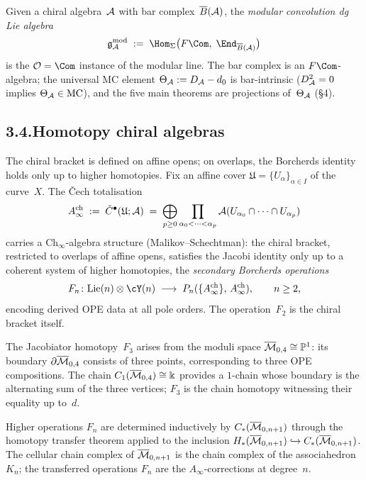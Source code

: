 Given a chiral algebra~$\mathcal{A}$ with bar complex~$\overline{B}(\mathcal{A})$,
the \emph{modular convolution dg Lie algebra}
\begin{equation}\label{eq:preface-gmod}
\gAmod
\;:=\;
\Hom_\Sigma\bigl(F\Com,\;\End_{\barB(\cA)}\bigr)
\end{equation}
is the $\cO=\Com$ instance of the modular line. The bar complex
is an $F\Com$-algebra; the universal MC element $\Theta_{\mathcal{A}} :=
D_{\mathcal{A}} - d_0$ is bar-intrinsic ($D_{\mathcal{A}}^2 = 0$ implies
$\Theta_{\mathcal{A}} \in \operatorname{MC}$), and the five main
theorems are projections of~$\Theta_{\mathcal{A}}$ (\S4).

\subsection*{3.4.\enspace Homotopy chiral algebras}

The chiral bracket is defined on affine opens; on overlaps, the
Borcherds identity holds only up to higher homotopies.
Fix an affine cover $\mathfrak U=\{U_\alpha\}_{\alpha\in I}$ of the
curve~$X$. The \v{C}ech totalisation
\[
A^{\mathrm{ch}}_\infty
\;:=\;
\check C^\bullet(\mathfrak U;\mathcal{A})
\;=\;
\bigoplus_{p\ge 0}
\prod_{\alpha_0<\cdots<\alpha_p}
\mathcal{A}(U_{\alpha_0}\cap\cdots\cap U_{\alpha_p})
\]
carries a $\mathrm{Ch}_\infty$-algebra structure
(Malikov--Schechtman): the chiral bracket, restricted to
overlaps of affine opens, satisfies the Jacobi identity only up to
a coherent system of higher homotopies, the \emph{secondary
Borcherds operations}
\[
F_n\colon\mathrm{Lie}(n)\otimes\cY(n)
\;\longrightarrow\;
P_n(\{A^{\mathrm{ch}}_\infty\},\,A^{\mathrm{ch}}_\infty),
\qquad n\ge 2,
\]
encoding derived OPE data at all pole orders. The operation~$F_2$
is the chiral bracket itself.

The Jacobiator homotopy~$F_3$ arises from the moduli space
$\overline{\mathcal{M}}_{0,4}\cong\mathbb P^1$: its boundary
$\partial\overline{\mathcal{M}}_{0,4}$ consists of three points,
corresponding to three OPE compositions. The chain
$C_1(\overline{\mathcal{M}}_{0,4})\cong\Bbbk$ provides a
$1$-chain whose boundary is the alternating sum of the three
vertices; $F_3$ is the chain homotopy witnessing their equality
up to~$d$.

Higher operations $F_n$ are determined inductively by
$C_*(\overline{\mathcal{M}}_{0,n+1})$ through the homotopy transfer
theorem applied to the inclusion
$H_*(\overline{\mathcal{M}}_{0,n+1})
\hookrightarrow
C_*(\overline{\mathcal{M}}_{0,n+1})$.
The cellular chain complex of $\overline{\mathcal{M}}_{0,n+1}$ is
the chain complex of the associahedron~$K_n$; the transferred
operations $F_n$ are the $A_\infty$-corrections at degree~$n$.

